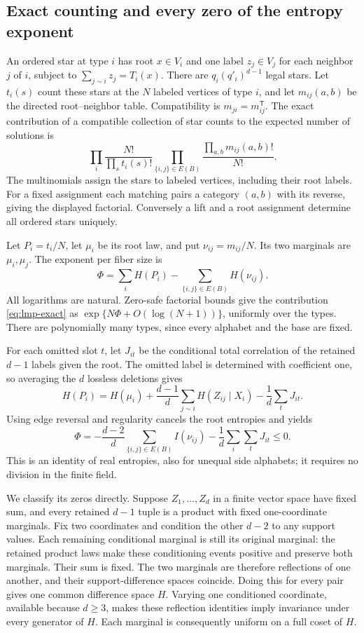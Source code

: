 \subsection{Exact counting and every zero of the entropy exponent}
An ordered star at type $i$ has root $x\in V_i$ and one label
$z_j\in V_j$ for each neighbor $j$ of $i$, subject to
$\sum_{j\sim i}z_j=T_i(x)$. There are
$q_i(q'_i)^{d-1}$ legal stars. Let $t_i(s)$ count these stars at the
$N$ labeled vertices of type $i$, and let $m_{ij}(a,b)$ be the
directed root--neighbor table. Compatibility is
$m_{ji}=m_{ij}^{\mathsf T}$. The exact contribution of a compatible
collection of star counts to the expected number of solutions is
\begin{equation}\label{eq:lmp-exact}
 \prod_i\frac{N!}{\prod_s t_i(s)!}
 \prod_{\{i,j\}\in E(B)}\frac{\prod_{a,b}m_{ij}(a,b)!}{N!}.
\end{equation}
The multinomials assign the stars to labeled vertices, including their
root labels. For a fixed assignment each matching pairs a category
$(a,b)$ with its reverse, giving the displayed factorial. Conversely
a lift and a root assignment determine all ordered stars uniquely.

Let $P_i=t_i/N$, let $\mu_i$ be its root law, and put
$\nu_{ij}=m_{ij}/N$. Its two marginals are $\mu_i,\mu_j$. The exponent
per fiber size is
\[
 \Phi=\sum_i H(P_i)-\sum_{\{i,j\}\in E(B)}H(\nu_{ij}).
\]
All logarithms are natural. Zero-safe factorial bounds give the
contribution \eqref{eq:lmp-exact} as
$\exp\{N\Phi+O(\log(N+1))\}$, uniformly over the types. There are
polynomially many types, since every alphabet and the base are fixed.

For each omitted slot $t$, let $J_{it}$ be the conditional total
correlation of the retained $d-1$ labels given the root. The omitted
label is determined with coefficient one, so averaging the $d$
lossless deletions gives
\[
 H(P_i)=H(\mu_i)+\frac{d-1}{d}\sum_{j\sim i}H(Z_{ij}\mid X_i)
                    -\frac1d\sum_tJ_{it}.
\]
Using edge reversal and regularity cancels the root entropies and yields
\begin{equation}\label{eq:lmp-entropy}
 \Phi=-\frac{d-2}{d}\sum_{\{i,j\}\in E(B)}I(\nu_{ij})
              -\frac1d\sum_i\sum_tJ_{it}\le0.
\end{equation}
This is an identity of real entropies, also for unequal side alphabets;
it requires no division in the finite field.

We classify its zeros directly. Suppose $Z_1,\ldots,Z_d$ in a finite
vector space have fixed sum, and every retained $d-1$ tuple is a
product with fixed one-coordinate marginals. Fix two coordinates and
condition the other $d-2$ to any support values. Each remaining
conditional marginal is still its original marginal: the retained
product laws make these conditioning events positive and preserve
both marginals. Their sum is
fixed. The two marginals are therefore reflections of one another,
and their support-difference spaces coincide. Doing this for every
pair gives one common difference space $H$. Varying one conditioned
coordinate, available because $d\ge3$, makes these reflection
identities imply invariance under every generator of $H$. Each
marginal is consequently uniform on a full coset of $H$.

